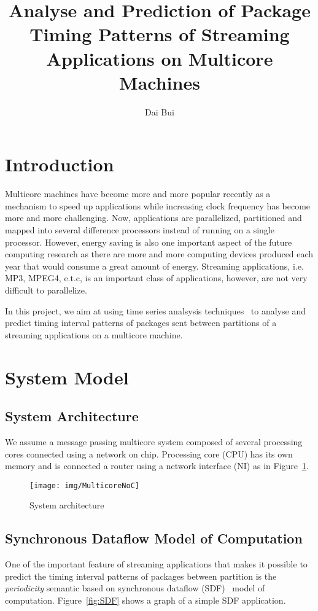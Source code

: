 \documentclass[12pt]{article}
\begin{document}
\title{Analyse and Prediction of Package Timing Patterns of Streaming
Applications on Multicore Machines}
\author{Dai Bui}
\maketitle
\section{Introduction}
Multicore machines have become more and more popular recently as a mechanism to
speed up applications while increasing clock frequency has become more and more
challenging. Now, applications are parallelized, partitioned and mapped into
several difference processors instead of running on a single processor. However, energy
saving is also one important aspect of the future computing research as there
are more and more computing devices produced each year that would consume a great
amount of energy. Streaming applications, i.e. MP3, MPEG4, e.t.c, is an
important class of applications, however, are not very difficult to parallelize.

In this project, we aim at using time series analsysis
techniques~\cite{BrillingerTimeSeries, ShumwayTimeSeries} to analyse and predict
timing interval patterns of packages sent between partitions of a streaming
applications on a multicore machine.

\section{System Model}
\subsection{System Architecture}
We assume a message passing multicore system composed of several processing
cores connected using a network on chip. Processing core (CPU) has its own
memory and is connected a router using a network interface (NI) as in
Figure~\ref{fig:MulticoreNoC}.

\begin{figure}[ht!]
\centering
\texttt{[image: img/MulticoreNoC]}
\caption{System architecture}\label{fig:MulticoreNoC}
\end{figure}

\subsection{Synchronous Dataflow Model of Computation}
One of the important feature of streaming applications that makes it possible to
predict the timing interval patterns of packages between partition is the
\textit{periodicity} semantic based on synchronous dataflow (SDF)~\cite{LeeSDF}
model of computation. Figure~\ref{fig:SDF} shows a graph of a simple SDF
application.
\end{document}
